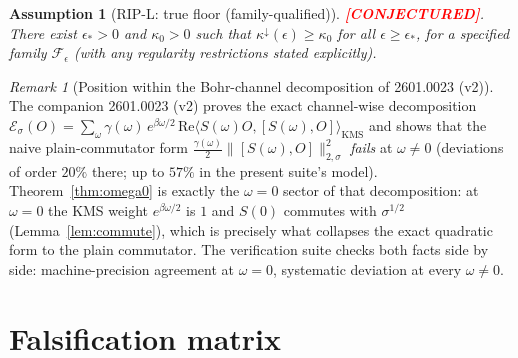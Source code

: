 \documentclass[11pt]{article}
\newtheorem{assumption}[theorem]{Assumption}
\theoremstyle{definition}
\theoremstyle{remark}
\newtheorem{remark}[theorem]{Remark}
\newcommand{\CONJ}{\textcolor{red}{\textbf{[CONJECTURED]}}}
\begin{document}
\begin{assumption}[RIP-L: true floor (family-qualified)]
\label{ass:ripl}
\CONJ. There exist $\epsilon_* > 0$ and $\kappa_0 > 0$ such that
$\kappa^{\downarrow}(\epsilon) \ge \kappa_0$ for all $\epsilon \ge
\epsilon_*$, for a specified family $\mathcal{F}_\epsilon$ (with any
regularity restrictions stated explicitly).
\end{assumption}

\begin{remark}[Position within the Bohr-channel decomposition of
2601.0023 (v2)]
\label{rem:0023}
The companion 2601.0023 (v2) proves the exact channel-wise decomposition
$\mathcal{E}_\sigma(O) = \sum_\omega \gamma(\omega)\, e^{\beta\omega/2}\,
\mathrm{Re}\langle S(\omega)O, [S(\omega), O]\rangle_{\mathrm{KMS}}$ and
shows that the naive plain-commutator form
$\frac{\gamma(\omega)}{2}\|[S(\omega),O]\|^2_{2,\sigma}$ \emph{fails} at
$\omega \ne 0$ (deviations of order $20\%$ there; up to $57\%$ in the
present suite's model). Theorem~\ref{thm:omega0} is exactly the
$\omega = 0$ sector of that decomposition: at $\omega = 0$ the KMS weight
$e^{\beta\omega/2}$ is $1$ and $S(0)$ commutes with $\sigma^{1/2}$
(Lemma~\ref{lem:commute}), which is precisely what collapses the exact
quadratic form to the plain commutator. The verification suite checks
both facts side by side: machine-precision agreement at $\omega = 0$,
systematic deviation at every $\omega \ne 0$.
\end{remark}

\section{Falsification matrix}
\end{document}

